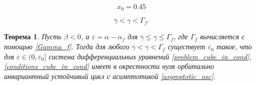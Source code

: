 \documentclass[fullscreen=true, unicode, bookmarks=false]{beamer}
\newtheorem{rustheorem}{Теорема }
\begin{document}
\begin{frame}
$$ x_0 = 0.45 $$

\vfill

$$ \overline{\gamma} < \gamma < \Gamma_f. $$

\end{frame}

\begin{frame}

\begin{rustheorem}
Пусть $ \beta < 0 $, а $ \varepsilon = \alpha - \alpha_f $ для $ \overline{\gamma} \leqslant \gamma \leqslant \Gamma_f $, где $ \Gamma_f $ вычисляется с помощью \eqref{Gamma_f}. Тогда для любого $ \overline{\gamma} < \gamma < \Gamma_f $ существует $ \varepsilon_0 $ такое, что для $ \varepsilon \in (0, \varepsilon_0] $ система дифференциальных уравнений \eqref{problem_cube_in_cond}, \eqref{conditions_cube_in_cond} имеет в окрестности нуля орбитально инвариантный устойчивый цикл с асимптотикой \eqref{asymptotic_osc}.
\end{rustheorem}

\end{frame}
\end{document}
